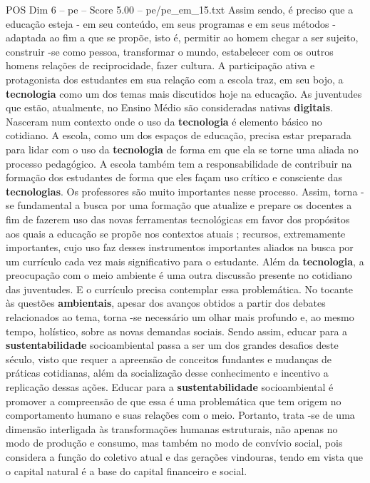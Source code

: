 \begin{textsample}{POS Dim 6 – pe – Score 5.00 – pe/pe\_em\_15.txt}
Assim sendo, é preciso que a educação esteja - em seu conteúdo, em seus programas e em seus métodos - adaptada ao fim a que se propõe, isto é, permitir ao homem chegar a ser sujeito, construir -se como pessoa, transformar o mundo, estabelecer com os outros homens relações de reciprocidade, fazer cultura.
A participação ativa e protagonista dos estudantes em sua relação com a escola traz, em seu bojo, a \textbf{tecnologia} como um dos temas mais discutidos hoje na educação.
As juventudes que estão, atualmente, no Ensino Médio são consideradas nativas \textbf{digitais}.
Nasceram num contexto onde o uso da \textbf{tecnologia} é elemento básico no cotidiano.
A escola, como um dos espaços de educação, precisa estar preparada para lidar com o uso da \textbf{tecnologia} de forma em que ela se torne uma aliada no processo pedagógico.
A escola também tem a responsabilidade de contribuir na formação dos estudantes de forma que eles façam uso crítico e consciente das \textbf{tecnologias}.
Os professores são muito importantes nesse processo.
Assim, torna -se fundamental a busca por uma formação que atualize e prepare os docentes a fim de fazerem uso das novas ferramentas tecnológicas em favor dos propósitos aos quais a educação se propõe nos contextos atuais ; recursos, extremamente importantes, cujo uso faz desses instrumentos importantes aliados na busca por um currículo cada vez mais significativo para o estudante.
Além da \textbf{tecnologia}, a preocupação com o meio ambiente é uma outra discussão presente no cotidiano das juventudes.
E o currículo precisa contemplar essa problemática.
No tocante às questões \textbf{ambientais}, apesar dos avanços obtidos a partir dos debates relacionados ao tema, torna -se necessário um olhar mais profundo e, ao mesmo tempo, holístico, sobre as novas demandas sociais.
Sendo assim, educar para a \textbf{sustentabilidade} socioambiental passa a ser um dos grandes desafios deste século, visto que requer a apreensão de conceitos fundantes e mudanças de práticas cotidianas, além da socialização desse conhecimento e incentivo a replicação dessas ações.
Educar para a \textbf{sustentabilidade} socioambiental é promover a compreensão de que essa é uma problemática que tem origem no comportamento humano e suas relações com o meio.
Portanto, trata -se de uma dimensão interligada às transformações humanas estruturais, não apenas no modo de produção e consumo, mas também no modo de convívio social, pois considera a função do coletivo atual e das gerações vindouras, tendo em vista que o capital natural é a base do capital financeiro e social.

\end{textsample}
